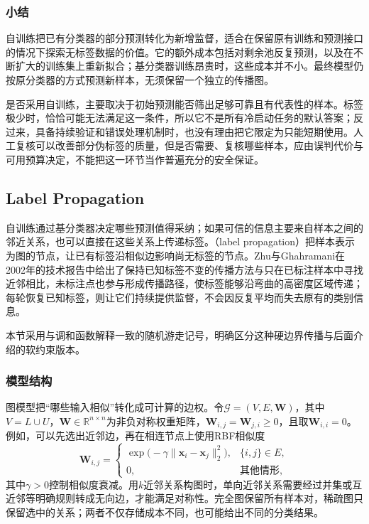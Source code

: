 \subsubsection{小结}
\label{sec:classification-self-training-summary}

自训练把已有分类器的部分预测转化为新增监督，适合在保留原有训练和预测接口的情况下探索无标签数据的价值。它的额外成本包括对剩余池反复预测，以及在不断扩大的训练集上重新拟合；基分类器训练昂贵时，这些成本并不小。最终模型仍按原分类器的方式预测新样本，无须保留一个独立的传播图。

是否采用自训练，主要取决于初始预测能否筛出足够可靠且有代表性的样本。标签极少时，恰恰可能无法满足这一条件，所以它不是所有冷启动任务的默认答案；反过来，具备持续验证和错误处理机制时，也没有理由把它限定为只能短期使用。人工复核可以改善部分伪标签的质量，但是否需要、复核哪些样本，应由误判代价与可用预算决定，不能把这一环节当作普遍充分的安全保证。

\subsection{Label Propagation}
\label{sec:classification-label-propagation}

自训练通过基分类器决定哪些预测值得采纳；如果可信的信息主要来自样本之间的邻近关系，也可以直接在这些关系上传递标签。（label propagation）把样本表示为图的节点，让已有标签沿相似边影响尚无标签的节点。Zhu与Ghahramani在2002年的技术报告中给出了保持已知标签不变的传播方法与只在已标注样本中寻找近邻相比，未标注点也参与形成传播路径，使标签能够沿弯曲的高密度区域传递；每轮恢复已知标签，则让它们持续提供监督，不会因反复平均而失去原有的类别信息。

本节采用与调和函数解释一致的随机游走记号，明确区分这种硬边界传播与后面介绍的软约束版本。

\subsubsection{模型结构}
\label{sec:classification-label-propagation-structure}

图模型把“哪些输入相似”转化成可计算的边权。令$\mathcal{G}=(V,E,\bm{W})$，其中$V=L\cup U$，$\bm{W}\in\mathbb{R}^{n\times n}$为非负对称权重矩阵，$\bm{W}_{i,j}=\bm{W}_{j,i}\geq0$，且取$\bm{W}_{i,i}=0$。例如，可以先选出近邻边，再在相连节点上使用RBF相似度
\begin{equation}
  \label{eq:classification-label-propagation-weights}
  \bm{W}_{i,j}=
  \begin{cases}
    \exp\bigl(-\gamma\lVert\bm{x}_i-\bm{x}_j\rVert_2^2\bigr),
      & \{i,j\}\in E,\\
    0, & \text{其他情形},
  \end{cases}
\end{equation}
其中$\gamma>0$控制相似度衰减。用$k$近邻关系构图时，单向近邻关系需要经过并集或互近邻等明确规则转成无向边，才能满足对称性。完全图保留所有样本对，稀疏图只保留选中的关系；两者不仅存储成本不同，也可能给出不同的分类结果。

